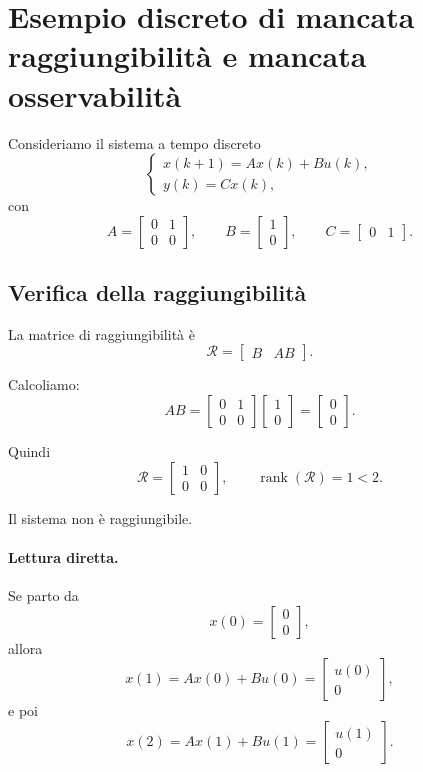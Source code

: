 \section{Esempio discreto di mancata raggiungibilità e mancata osservabilità}

Consideriamo il sistema a tempo discreto
\[
\begin{cases}
x(k+1)=Ax(k)+Bu(k),\\
y(k)=Cx(k),
\end{cases}
\]
con
\[
A=
\begin{bmatrix}
0 & 1\\
0 & 0
\end{bmatrix},
\qquad
B=
\begin{bmatrix}
1\\
0
\end{bmatrix},
\qquad
C=
\begin{bmatrix}
0 & 1
\end{bmatrix}.
\]

\subsection{Verifica della raggiungibilità}

La matrice di raggiungibilità è
\[
\mathcal{R}=\begin{bmatrix}B & AB\end{bmatrix}.
\]

Calcoliamo:
\[
AB=
\begin{bmatrix}
0 & 1\\
0 & 0
\end{bmatrix}
\begin{bmatrix}
1\\
0
\end{bmatrix}
=
\begin{bmatrix}
0\\
0
\end{bmatrix}.
\]

Quindi
\[
\mathcal{R}=
\begin{bmatrix}
1 & 0\\
0 & 0
\end{bmatrix},
\qquad
\operatorname{rank}(\mathcal{R})=1<2.
\]

Il sistema non è raggiungibile.

\paragraph{Lettura diretta.}
Se parto da
\[
x(0)=\begin{bmatrix}0\\0\end{bmatrix},
\]
allora
\[
x(1)=Ax(0)+Bu(0)=\begin{bmatrix}u(0)\\0\end{bmatrix},
\]
e poi
\[
x(2)=Ax(1)+Bu(1)=\begin{bmatrix}u(1)\\0\end{bmatrix}.
\]

